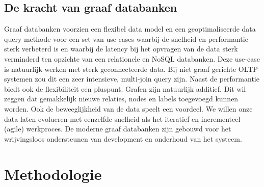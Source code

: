 \subsection{De kracht van graaf databanken}
Graaf databanken voorzien een flexibel data model en een geoptimaliseerde data query methode voor een set van use-cases waarbij de snelheid en performantie sterk verbeterd is en waarbij de latency bij het opvragen van de data sterk verminderd ten opzichte van een relationele en NoSQL databanken. Deze use-case is natuurlijk werken met sterk geconnecteerde data. Bij niet graaf gerichte OLTP systemen zou dit een zeer intensieve, multi-join query zijn. \autocite{graphDatabases} 
Naast de performantie biedt ook de flexibiliteit een pluspunt. Grafen zijn natuurlijk additief. Dit wil zeggen dat gemakkelijk nieuwe relaties, nodes en labels toegevoegd kunnen worden.\autocite{graphDatabases} 
Ook de beweeglijkheid van de data speelt een voordeel. We willen onze data laten evolueren met eenzelfde snelheid als het iteratief en incrementeel (agile) werkproces. De moderne graaf databanken zijn gebouwd voor het wrijvingsloos ondersteunen van development en onderhoud van het systeem.\autocite{graphDatabases} 





\section{Methodologie}
\label{sec:methodologie}

